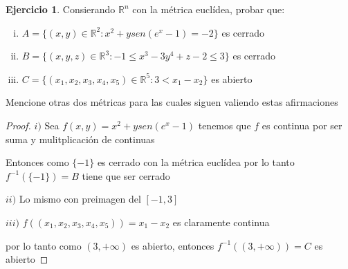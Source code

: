 \documentclass[12pt]{article}
\newcommand{\R}{\mathbb{R}}
\theoremstyle{definition}
\newtheorem{ej}{Ejercicio}
\begin{document}
 \begin{ej}
   Consierando $\R^n$ con la métrica euclídea, probar que:
   \begin{enumerate}[i.]
     \item $A = \{(x,y) \in \R^2 : x^2 +ysen(e^x -1) = -2\}$ es cerrado
     \item $B = \{(x,y,z) \in \R^3 : -1 \leq x^3 -3y^4 + z -2 \leq 3\}$ es cerrado
     \item $C = \{(x_1,x_2,x_3,x_4,x_5) \in \R^5 : 3 < x_1 -x_2\}$ es abierto
   \end{enumerate}
   
   Mencione otras dos métricas para las cuales siguen valiendo estas afirmaciones
   \begin{proof}
   $i)$ Sea $f(x,y) =  x^2 +ysen(e^x -1) $ tenemos que $f$ es continua por ser suma y mulitplicación de continuas

   Entonces como $\{-1\}$ es cerrado con la métrica euclídea por lo tanto $f^{-1}(\{-1\}) = B$ tiene que ser cerrado

 $ii)$ Lo mismo con preimagen del $[-1,3 ]$

 $iii)$ $f((x_1,x_2,x_3,x_4,x_5)) = x_1 - x_2$ es claramente continua

 por lo tanto como $(3,+\infty)$ es abierto, entonces  $f^{-1}((3,+\infty)) = C$ es abierto
   \end{proof}
 \end{ej}
\end{document}
